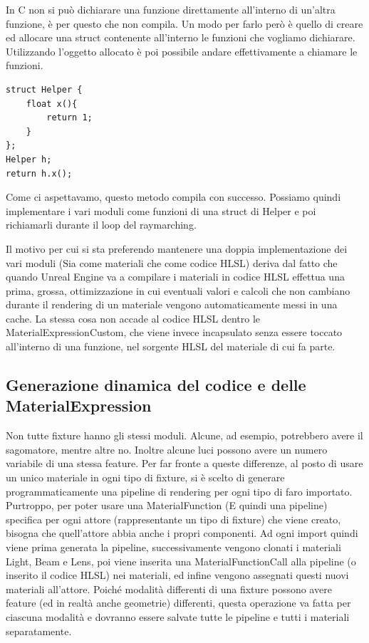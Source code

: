 \documentclass[main.tex]{subfiles}
\begin{document}
In C non si può dichiarare una funzione direttamente all'interno di un'altra funzione, è per questo che non compila. Un modo per farlo però è quello di creare ed allocare una struct contenente all'interno le funzioni che vogliamo dichiarare. Utilizzando l'oggetto allocato è poi possibile andare effettivamente a chiamare le funzioni.
\begin{lstlisting}
struct Helper {
    float x(){
        return 1;
    }
};
Helper h;
return h.x();
\end{lstlisting}
Come ci aspettavamo, questo metodo compila con successo. Possiamo quindi implementare i vari moduli come funzioni di una struct di Helper e poi richiamarli durante il loop del raymarching.

Il motivo per cui si sta preferendo mantenere una doppia implementazione dei vari moduli (Sia come materiali che come codice HLSL) deriva dal fatto che quando Unreal Engine va a compilare i materiali in codice HLSL effettua una prima, grossa, ottimizzazione in cui eventuali valori e calcoli che non cambiano durante il rendering di un materiale vengono automaticamente messi in una cache. La stessa cosa non accade al codice HLSL dentro le MaterialExpressionCustom, che viene invece incapsulato senza essere toccato all'interno di una funzione, nel sorgente HLSL del materiale di cui fa parte. \cite{hlslNoOptimize}

\lstset{language=UEcpp}
\subsection{Generazione dinamica del codice e delle MaterialExpression}\label{subsec:2_codeGeneration}
Non tutte fixture hanno gli stessi moduli. Alcune, ad esempio, potrebbero avere il sagomatore, mentre altre no. Inoltre alcune luci possono avere un numero variabile di una stessa feature. Per far fronte a queste differenze, al posto di usare un unico materiale in ogni tipo di fixture, si è scelto di generare programmaticamente una pipeline di rendering per ogni tipo di faro importato. Purtroppo, per poter usare una MaterialFunction (E quindi una pipeline) specifica per ogni attore (rappresentante un tipo di fixture) che viene creato, bisogna che quell'attore abbia anche i propri componenti. Ad ogni import quindi viene prima generata la pipeline, successivamente vengono clonati i materiali Light, Beam e Lens, poi viene inserita una MaterialFunctionCall alla pipeline (o inserito il codice HLSL) nei materiali, ed infine vengono assegnati questi nuovi materiali all'attore. 
Poiché modalità differenti di una fixture possono avere feature (ed in realtà anche geometrie) differenti, questa operazione va fatta per ciascuna modalità e dovranno essere salvate tutte le pipeline e tutti i materiali separatamente.
\end{document}

